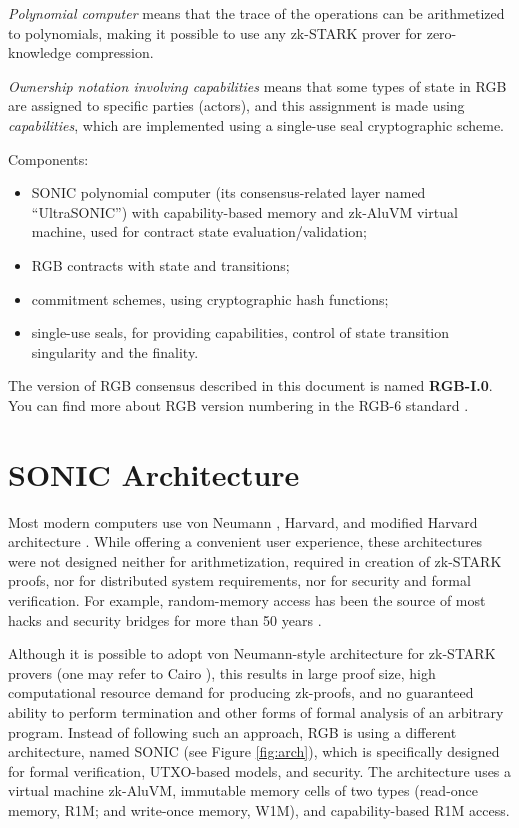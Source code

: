 \documentclass[9pt,oneside]{amsart}
\begin{document}
\begin{multicols}{2}
\emph{Polynomial computer} means that the trace of the operations can be arithmetized to polynomials,
making it possible to use any zk-STARK prover for zero-knowledge compression.

\emph{Ownership notation involving capabilities} means that some types of state in RGB
are assigned to specific parties (actors), and this assignment is made using \emph{capabilities},
which are implemented using a single-use seal cryptographic scheme.

Components:
\begin{itemize}
  \item SONIC polynomial computer (its consensus-related layer named ``UltraSONIC'')
  with capability-based memory and zk-AluVM virtual machine,
  used for contract state evaluation/validation;
  \item RGB contracts with state and transitions;
  \item commitment schemes, using cryptographic hash functions;
  \item single-use seals, for providing capabilities,
  control of state transition singularity and the finality.
\end{itemize}

The version of RGB consensus described in this document is named \textbf{RGB-I.0}.
You can find more about RGB version numbering in the RGB-6 standard \cite{RGB6}.

\section{SONIC Architecture}\label{Sonic}

Most modern computers use von Neumann \cite{vonNeumann},
Harvard, and modified Harvard architecture \cite{Harvard}.
While offering a convenient user experience, these architectures were not designed neither for
arithmetization, required in creation of zk-STARK proofs, nor for distributed system requirements,
nor for security and formal verification.
For example, random-memory access has been the source
of most hacks and security bridges for more than 50 years \cite{RAM}.

Although it is possible to adopt von Neumann-style architecture for zk-STARK provers
(one may refer to Cairo \cite{Cairo}), this results in large proof size,
high computational resource demand for producing zk-proofs,
and no guaranteed ability to perform termination and
other forms of formal analysis of an arbitrary program.
Instead of following such an approach, RGB is using a different architecture,
named SONIC (see Figure \ref{fig:arch}),
which is specifically designed for formal verification, UTXO-based models, and security.
The architecture uses a virtual machine zk-AluVM, immutable memory cells of two types
(read-once memory, R1M; and write-once memory, W1M), and capability-based R1M access.

\end{multicols}
\end{document}
